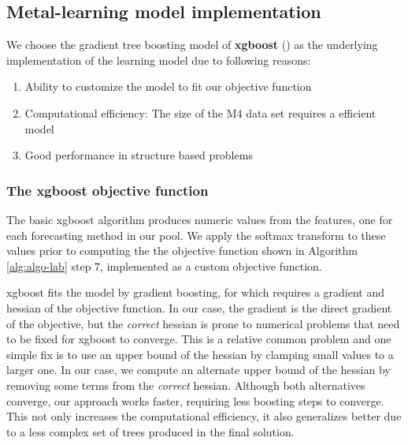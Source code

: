 \documentclass[11pt,a4paper,]{article}
\providecommand{\tightlist}{%
  \setlength{\itemsep}{0pt}\setlength{\parskip}{0pt}}
\theoremstyle{definition}
\theoremstyle{definition}
\theoremstyle{definition}
\theoremstyle{remark}
\begin{document}

\subsection{Metal-learning model
implementation}\label{metal-learning-model-implementation}


We choose the gradient tree boosting model of \textbf{xgboost}
(\textcite{chen2016xgboost}) as the underlying implementation of the
learning model due to following reasons:

\begin{enumerate}
\def\labelenumi{\arabic{enumi}.}
\tightlist
\item
  Ability to customize the model to fit our objective function
\item
  Computational efficiency: The size of the M4 data set requires a
  efficient model
\item
  Good performance in structure based problems
\end{enumerate}

\subsubsection{The xgboost objective
function}\label{the-xgboost-objective-function}

The basic xgboost algorithm produces numeric values from the features,
one for each forecasting method in our pool. We apply the softmax
transform to these values prior to computing the the objective function
shown in Algorithm \ref{alg:algo-lab} step 7, implemented as a custom
objective function.

xgboost fits the model by gradient boosting, for which requires a
gradient and hessian of the objective function. In our case, the
gradient is the direct gradient of the objective, but the \emph{correct}
hessian is prone to numerical problems that need to be fixed for xgboost
to converge. This is a relative common problem and one simple fix is to
use an upper bound of the hessian by clamping small values to a larger
one. In our case, we compute an alternate upper bound of the hessian by
removing some terms from the \emph{correct} hessian. Although both
alternatives converge, our approach works faster, requiring less
boosting steps to converge. This not only increases the computational
efficiency, it also generalizes better due to a less complex set of
trees produced in the final solution.
\end{document}
